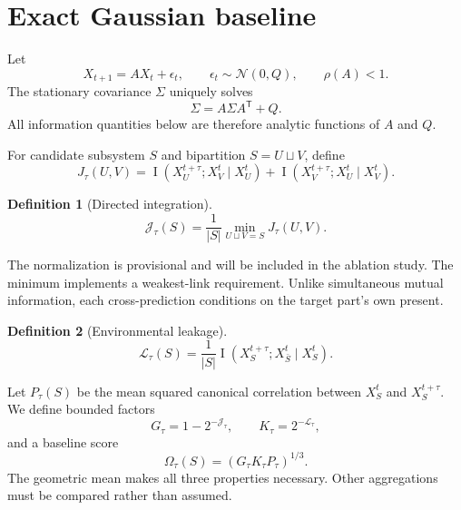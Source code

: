 \documentclass[11pt]{article}
\newtheorem{definition}{Definition}
\newcommand{\MI}{\operatorname{I}}
\begin{document}
\section{Exact Gaussian baseline}

Let
\begin{equation}
X_{t+1}=AX_t+\epsilon_t,\qquad
\epsilon_t\sim\mathcal N(0,Q),\qquad \rho(A)<1.
\end{equation}
The stationary covariance $\Sigma$ uniquely solves
\begin{equation}
\Sigma=A\Sigma A^{\mathsf T}+Q.
\end{equation}
All information quantities below are therefore analytic functions of $A$ and
$Q$.

For candidate subsystem $S$ and bipartition $S=U\sqcup V$, define
\begin{equation}
J_\tau(U,V)=
\MI(X_U^{t+\tau};X_V^t\mid X_U^t)
+\MI(X_V^{t+\tau};X_U^t\mid X_V^t).
\end{equation}

\begin{definition}[Directed integration]
\begin{equation}
\mathcal J_\tau(S)=\frac{1}{|S|}
\min_{U\sqcup V=S}J_\tau(U,V).
\end{equation}
\end{definition}

The normalization is provisional and will be included in the ablation study.
The minimum implements a weakest-link requirement. Unlike simultaneous mutual
information, each cross-prediction conditions on the target part's own present.

\begin{definition}[Environmental leakage]
\begin{equation}
\mathcal L_\tau(S)=\frac{1}{|S|}
\MI(X_S^{t+\tau};X_{\bar S}^{t}\mid X_S^t).
\end{equation}
\end{definition}

Let $P_\tau(S)$ be the mean squared canonical correlation between $X_S^t$ and
$X_S^{t+\tau}$. We define bounded factors
\begin{equation}
G_\tau=1-2^{-\mathcal J_\tau},\qquad
K_\tau=2^{-\mathcal L_\tau},
\end{equation}
and a baseline score
\begin{equation}
\Omega_\tau(S)=\left(G_\tau K_\tau P_\tau\right)^{1/3}.
\end{equation}
The geometric mean makes all three properties necessary. Other aggregations
must be compared rather than assumed.
\end{document}
